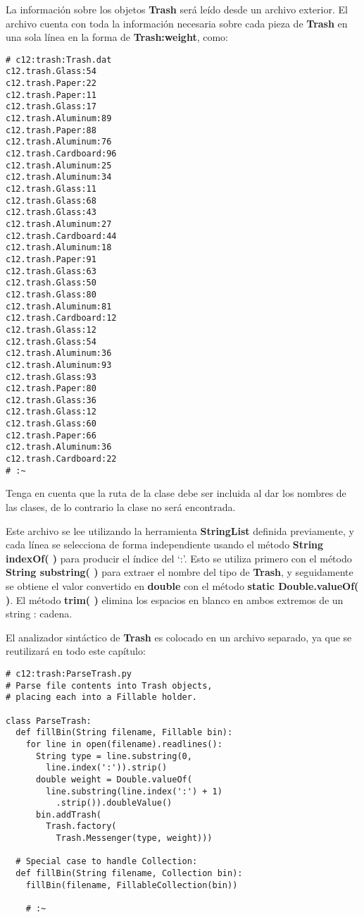 La información sobre los objetos \textbf{Trash} será leído desde un archivo exterior. El archivo cuenta con toda la información necesaria sobre cada pieza de \textbf{Trash} en una sola línea en la forma de \textbf{Trash:weight}, como:     \newline

\begin{lstlisting} 
# c12:trash:Trash.dat 
c12.trash.Glass:54 
c12.trash.Paper:22 
c12.trash.Paper:11 
c12.trash.Glass:17 
c12.trash.Aluminum:89 
c12.trash.Paper:88 
c12.trash.Aluminum:76 
c12.trash.Cardboard:96 
c12.trash.Aluminum:25 
c12.trash.Aluminum:34 
c12.trash.Glass:11 
c12.trash.Glass:68 
c12.trash.Glass:43 
c12.trash.Aluminum:27 
c12.trash.Cardboard:44 
c12.trash.Aluminum:18 
c12.trash.Paper:91 
c12.trash.Glass:63 
c12.trash.Glass:50 
c12.trash.Glass:80 
c12.trash.Aluminum:81 
c12.trash.Cardboard:12 
c12.trash.Glass:12 
c12.trash.Glass:54 
c12.trash.Aluminum:36 
c12.trash.Aluminum:93 
c12.trash.Glass:93 
c12.trash.Paper:80 
c12.trash.Glass:36 
c12.trash.Glass:12 
c12.trash.Glass:60 
c12.trash.Paper:66 
c12.trash.Aluminum:36 
c12.trash.Cardboard:22 
# :~ 
\end{lstlisting}

Tenga en cuenta que la ruta de la clase debe ser incluida al dar los nombres de las clases, de lo contrario la clase no será encontrada.\newline

Este archivo se lee utilizando la herramienta \textbf{StringList} definida previamente, y cada línea se selecciona de forma independiente usando el método \textbf{String indexOf( )} para producir el índice del ‘:’. Esto se utiliza primero con el método \textbf{String substring( )} para extraer el nombre del tipo de \textbf{Trash}, y seguidamente se obtiene el valor convertido en \textbf{double} con el método \textbf{static Double.valueOf( )}. El método \textbf{trim( )}  elimina los espacios en blanco en ambos extremos de un string : cadena. \newline

El analizador sintáctico de \textbf{Trash } es colocado en un archivo separado, ya que se reutilizará en todo este capítulo: \newline

\begin{lstlisting} 
# c12:trash:ParseTrash.py  
# Parse file contents into Trash objects, 
# placing each into a Fillable holder. 

class ParseTrash: 
  def fillBin(String filename, Fillable bin): 
    for line in open(filename).readlines(): 
      String type = line.substring(0,  
        line.index(':')).strip() 
      double weight = Double.valueOf( 
        line.substring(line.index(':') + 1) 
          .strip()).doubleValue() 
      bin.addTrash( 
        Trash.factory( 
          Trash.Messenger(type, weight))) 
          
  # Special case to handle Collection: 
  def fillBin(String filename, Collection bin): 
    fillBin(filename, FillableCollection(bin)) 
    
    # :~
\end{lstlisting}

